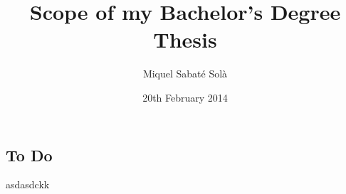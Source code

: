 \documentclass[a4paper,12pt]{article}
\begin{document}
\title{Scope of my Bachelor's Degree Thesis}
\author{Miquel Sabaté Solà}
\date{20th February 2014}
\maketitle

\setcounter{page}{1}

\vspace{-1.5cm}

\subsection*{To Do}

asdasdckk
\end{document}
